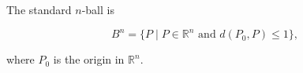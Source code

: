 The standard $n$-ball is

$$B^n = \{ P \mid P \in \mathbb{R}^n \text{ and } d(P_0, P) \leqslant 1 \},$$

where $P_0$ is the origin in $\mathbb{R}^n$.
